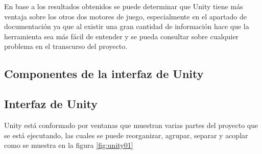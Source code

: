 \documentclass[a4paper, openright, 12pt]{report}
\begin{document}
\justify
En base a los resultados obtenidos se puede determinar que Unity tiene más ventaja sobre los otros dos motores de juego, especialmente en el apartado de documentación ya que al existir una gran cantidad de información hace que la herramienta sea más fácil de entender y se pueda consultar sobre cualquier problema en el transcurso del proyecto.

\subsection{Componentes de la interfaz de Unity}

\subsection*{Interfaz de Unity}
Unity está conformado por ventanas que muestran varias partes del proyecto que se está ejecutando, las cuales se puede reorganizar, agrupar, separar y acoplar como se muestra en la figura \ref{fig:unity01}
\end{document}
